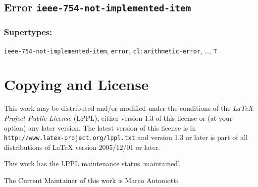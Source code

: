 \documentclass[10pt,fleqn]{article}
\newcommand{\CL}{\textsf{Common~Lisp}}
\newcommand{\code}[1]{\texttt{#1}}
\newcommand{\DDictionaryItem}[1]{\vspace*{6pt}\noindent\hrulefill\vspace*{-9pt}\subsection*{#1}}
\newcommand{\DSupertypes}{\subsubsection*{Supertypes:}}
\begin{document}
\DDictionaryItem{Error \code{ieee-754-not-implemented-item}}

\DSupertypes{}

\code{ieee-754-not-implemented-item}, \code{error},
\code{cl:arithmetic-error}, \ldots, \code{T}


\nocite{2012:LIA1,2001:LIA2,2004:LIA3}
\nocite{1994:ANSICL}





  
  



\appendix

\section{Copying and License}

This work may be distributed and/or modified under the conditions of
the \emph{LaTeX Project Public License} (LPPL), either version 1.3 of this license
or (at your option) any later version. The latest version of this
license is in \texttt{http://www.latex-project.org/lppl.txt} and version 1.3 or
later is part of all distributions of LaTeX version 2005/12/01 or
later.

\noindent
This work has the LPPL maintenance status `maintained'.

\noindent
The Current Maintainer of this work is Marco Antoniotti.
\end{document}
